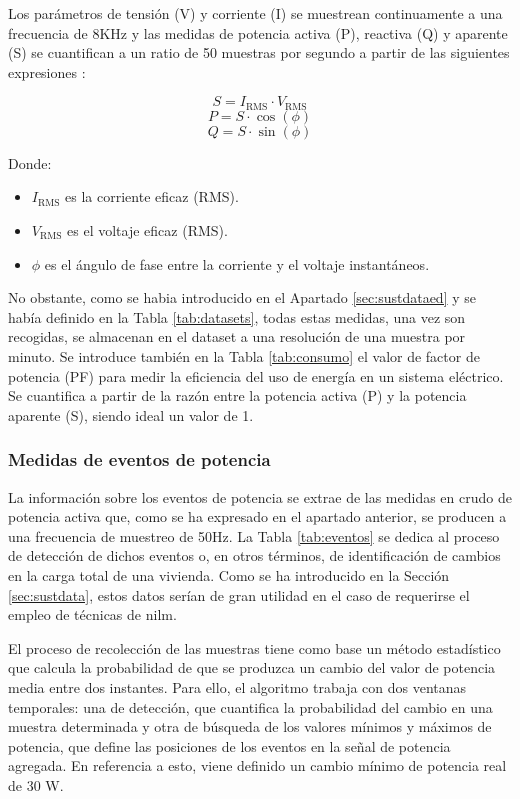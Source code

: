 Los parámetros de tensión (V) y corriente (I) se muestrean continuamente a una frecuencia de 8KHz y las medidas de potencia activa (P), reactiva (Q) y aparente (S) se cuantifican a un ratio de 50 muestras por segundo a partir de las siguientes expresiones \cite{sustdata}:

\[ S = I_{\text{RMS}} \cdot V_{\text{RMS}} \]
\[ P = S \cdot \cos(\phi) \]
\[ Q = S \cdot \sin(\phi) \]

    Donde:
\begin{itemize}
    \renewcommand{\labelitemi}{}
    \item \( I_{\text{RMS}} \) es la corriente eficaz (RMS).
    \item \( V_{\text{RMS}} \) es el voltaje eficaz (RMS).
    \item \( \phi \) es el ángulo de fase entre la corriente y el voltaje instantáneos.
\end{itemize}

\vspace{3mm}

No obstante, como se habia introducido en el Apartado \ref{sec:sustdataed} y se había definido en la Tabla \ref{tab:datasets}, todas estas medidas, una vez son recogidas, se almacenan en el dataset a una resolución de una muestra por minuto. Se introduce también en la Tabla \ref{tab:consumo} el valor de factor de potencia (PF) para medir la eficiencia del uso de energía en un sistema eléctrico. Se cuantifica a partir de la razón entre la potencia activa (P) y la potencia aparente (S), siendo ideal un valor de 1. 

\subsubsection{Medidas de eventos de potencia}

La información sobre los eventos de potencia se extrae de las medidas en crudo de potencia activa que, como se ha expresado en el apartado anterior, se producen a una frecuencia de muestreo de 50Hz. La Tabla \ref{tab:eventos} se dedica al proceso de detección de dichos eventos o, en otros términos, de identificación de cambios en la carga total de una vivienda. Como se ha introducido en la Sección \ref{sec:sustdata}, estos datos serían de gran utilidad en el caso de requerirse el empleo de técnicas de \gls{nilm}.   

\vspace{3mm}

El proceso de recolección de las muestras tiene como base un método estadístico que calcula la probabilidad de que se produzca un cambio del valor de potencia media entre dos instantes. Para ello, el algoritmo trabaja con dos ventanas temporales: una de detección, que cuantifica la probabilidad del cambio en una muestra determinada y otra de búsqueda de los valores mínimos y máximos de potencia, que define las posiciones de los eventos en la señal de potencia agregada. En referencia a esto, viene definido un cambio mínimo de potencia real de 30 W.

